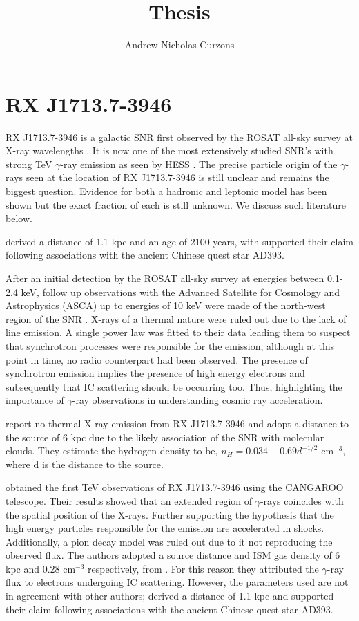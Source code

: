 \documentclass[12pt,a4paper]{article}
\title{Thesis}
\author{Andrew Nicholas Curzons}
\begin{document}
\pagebreak 

\newpage
\section{RX J1713.7-3946}

RX J1713.7-3946 is a galactic SNR first observed by the ROSAT all-sky survey at X-ray wavelengths \citep{1996rftu.proc..267P}. It is now one of the most extensively studied SNR's with strong TeV $\gamma$-ray emission as seen by HESS \citep{2004Natur.432...75A}. The precise particle origin of the $\gamma$-rays seen at the location of RX J1713.7-3946 is still unclear and remains the biggest question. Evidence for both a hadronic and leptonic model has been shown but the exact fraction of each is still unknown. We discuss such literature below.

\cite{1996rftu.proc..267P} derived a distance of 1.1 kpc and an age of 2100 years, with \cite{1997A&A...318L..59W} supported their claim following associations with the ancient Chinese quest star AD393.

After an initial detection by the ROSAT all-sky survey at energies between 0.1-2.4 keV, follow up observations with the Advanced Satellite for Cosmology and Astrophysics (ASCA) up to energies of 10 keV were made of the north-west region of the SNR \citep{1997PASJ...49L...7K}. X-rays of a thermal nature were ruled out due to the lack of line emission. A single power law was fitted to their data leading them to suspect that synchrotron processes were responsible for the emission, although at this point in time, no radio counterpart had been observed. The presence of synchrotron emission implies the presence of high energy electrons and subsequently that IC scattering should be occurring too. Thus, highlighting the importance of $\gamma$-ray observations in understanding cosmic ray acceleration. 

\cite{1999ApJ...525..357S} report no thermal X-ray emission from RX J1713.7-3946 and adopt a distance to the source of 6 kpc due to the likely association of the SNR with molecular clouds. They estimate the hydrogen density to be, $n_H = 0.034-0.69 d^{-1/2}$ cm$^{-3}$, where d is the distance to the source.

\cite{2000A&A...354L..57M} obtained the first TeV observations of RX J1713.7-3946 using the CANGAROO telescope. Their results showed that an extended region of $\gamma$-rays coincides with the spatial position of the X-rays. Further supporting the hypothesis that the high energy particles responsible for the emission are accelerated in shocks. Additionally, a pion decay model was ruled out due to it not reproducing the observed flux. The authors adopted a source distance and ISM gas density of 6 kpc and 0.28 cm$^{-3}$ respectively, from \cite{1999ApJ...525..357S}. For this reason they attributed the $\gamma$-ray flux to electrons undergoing IC scattering. However, the parameters used are not in agreement with other authors; \cite{1996rftu.proc..267P} derived a distance of 1.1 kpc and \cite{1997A&A...318L..59W} supported their claim following associations with the ancient Chinese quest star AD393.
\end{document}
